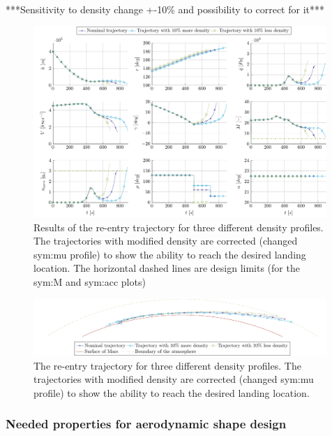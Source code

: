 ***Sensitivity to density change +-10\% and possibility to correct for it***\\
\begin{figure}
	\centering
	\includegraphics[width=0.99\textwidth]{Figure/Orbit/sensitivity_entry.pdf}
	\caption{Results of the re-entry trajectory for three different density profiles. The trajectories with modified density are corrected (changed \gls{sym:mu} profile) to show the ability to reach the desired landing location. The horizontal dashed lines are design limits (for the \gls{sym:M} and \gls{sym:acc} plots)}
	\label{fig:orbit_entry_data}
\end{figure}

\begin{figure}[h]
	\centering
	\includegraphics[width=0.99\textwidth]{Figure/Orbit/entry_mars.pdf}
	\caption{The re-entry trajectory for three different density profiles. The trajectories with modified density are corrected (changed \gls{sym:mu} profile) to show the ability to reach the desired landing location.}
	\label{fig:entry_mars}
\end{figure}

\subsubsection{Needed properties for aerodynamic shape design} \label{sec:trajectory_summary}
